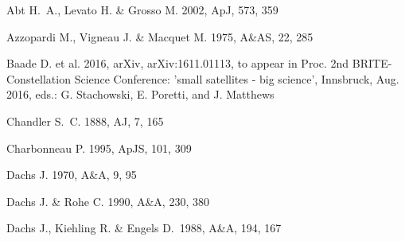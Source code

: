 \documentclass[useAMS,usenatbib]{mn2e}
\begin{document}
\begin{thebibliography}{}


 Abt H.~A., Levato H. \& Grosso M. 2002, ApJ, 573, 359 


 Azzopardi M., Vigneau J. \& Macquet M. 1975, A\&AS, 22, 285 



 Baade D. et al. 2016, arXiv, arXiv:1611.01113, to appear in Proc. 2nd BRITE-Constellation Science Conference: 'small satellites - big science', Innsbruck, Aug. 2016, eds.: G. Stachowski, E. Poretti, and J. Matthews








 Chandler S.~C. 1888, AJ, 7, 165 

 Charbonneau P. 1995, ApJS, 101, 309 




 


 Dachs J. 1970, A\&A, 9, 95 

 Dachs J. \& Rohe C. 1990, A\&A, 230, 380 



 Dachs J., Kiehling R. \& Engels D.\ 1988, A\&A, 194, 167 




\end{thebibliography}
\end{document}
